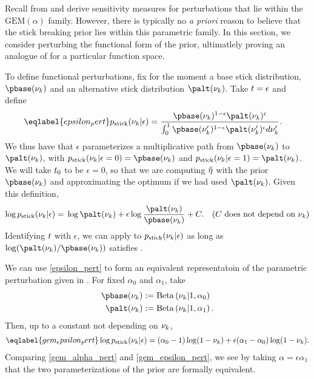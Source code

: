 Recall from  and  derive
sensitivity measures for perturbations that lie within the
$\mathrm{GEM}(\alpha)$ family.  However, there is typically no {\em a priori}
reason to believe that the stick breaking prior lies within this parametric
family.  In this section, we consider perturbing the functional form of the
prior, ultimatlely proving an analogue of  for a particular
function space.

To define functional perturbations, fix for the moment a base stick
distribution, $\pbase(\nuk)$ and an alternative stick distribution $\palt(\nuk)$.
Take $t = \epsilon$ and define
%
\begin{align}\eqlabel{epsilon_pert}
%
\pstick(\nuk \vert \epsilon) ={}&
\frac{\pbase(\nuk)^{1 - \epsilon} \palt(\nuk)^\epsilon}
     {\int_0^1 \pbase(\nuk')^{1 - \epsilon} \palt(\nuk')^\epsilon d\nuk'}.
%
\end{align}
%
We thus have that $\epsilon$ parameterizes a multiplicative path from
$\pbase(\nuk)$ to $\palt(\nuk)$, with $\pstick(\nuk \vert \epsilon = 0) = \pbase(\nuk)$
and $\pstick(\nuk \vert \epsilon=1) = \palt(\nuk)$.  We will take
$t_0$ to be $\epsilon = 0$, so that we are computing $\hat\eta$ with the
prior $\pbase(\nuk)$ and approximating the optimum if we had used $\palt(\nuk)$.
%
Given this definition,
%
\begin{align*}
%
\log \pstick(\nuk \vert \epsilon) ={}&
    \log \palt(\nuk) + \epsilon \log \frac{\palt(\nuk)}{\pbase(\nuk)} + \const.
    & \constdesc{\nuk}
%
\end{align*}
%
Identifying $t$ with $\epsilon$, we can apply  to
$p_{\mathrm{stick}}(\nu_{k} \vert \epsilon)$ as long as $\log (\palt(\nuk) / \pbase(\nuk))$
satisfies .

\begin{ex}
%
We can use \eqref{epsilon_pert} to form an equivalent representatoin of the
parametric perturbation given in .  For fixed
$\alpha_0$ and $\alpha_1$, take
%
\begin{align*}
%
\pbase(\nuk) :={}& \betadist{\nuk \vert 1, \alpha_0}\\
\palt(\nuk) :={}& \betadist{\nuk \vert 1, \alpha_1}.
%
\end{align*}
%
Then, up to a constant not depending on $\nu_{k}$,
%
\begin{align}\eqlabel{gem_epsilon_pert}
%
\log \pstick(\nuk \vert \epsilon) =
    (\alpha_0 - 1) \log(1 - \nuk) +
    \epsilon  (\alpha_1 - \alpha_0) \log(1 - \nuk).
%
\end{align}
%
Comparing \eqref{gem_alpha_pert} and \eqref{gem_epsilon_pert}, we see by taking
$\alpha = \epsilon \alpha_1$ that the two parameterizations of the prior are
formally equivalent.
%
\end{ex}

